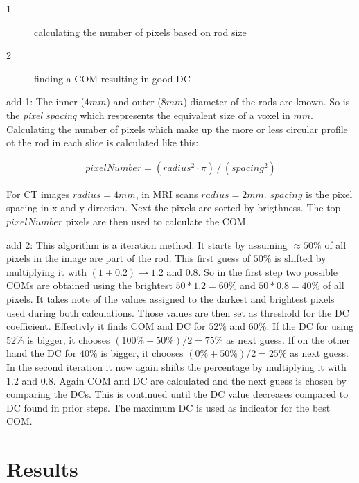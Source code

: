 \documentclass[parskip,bibtotoc,final,twoside=false,titlepage,a4paper,english,12pt,titlepage,a4paper]{scrbook}
\begin{document}
\begin{description}
 \item[1] calculating the number of pixels based on rod size
 \item[2] finding a COM resulting in good DC
\end{description}

add 1:
The inner ($4mm$) and outer ($8mm$) diameter of the rods are known. So is the \textit{pixel spacing} which respresents the equivalent size of a voxel in $mm$.
Calculating the number of pixels which make up the more or less circular profile ot the rod in each slice is calculated like this:

\begin{align}
 pixelNumber = (radius^2 \cdot \pi) \, / \, (spacing^2)
\end{align}

For CT images $radius = 4mm$, in MRI scans $radius = 2mm$. $spacing$ is the pixel spacing in x and y direction.
Next the pixels are sorted by brigthness. The top $pixelNumber$ pixels are then used to calculate the COM.

add 2:
This algorithm is a iteration method. It starts by assuming $\approx 50\%$ of all pixels in the image are part of the rod.
This first guess of $50\%$ is shifted by multiplying it with $(1 \pm 0.2) \rightarrow 1.2$ and $0.8$.
So in the first step two possible COMs are obtained using the brightest $50*1.2 = 60\%$ and $50*0.8 = 40\%$ of all pixels.
It takes note of the values assigned to the darkest and brightest pixels used during both calculations.
Those values are then set as threshold for the DC coefficient.
Effectivly it finds COM and DC for $52\%$ and $60\%$. If the DC for using 52\% is bigger, it chooses $(100\% + 50\%) / 2 = 75\%$ as next guess.
If on the other hand the DC for $40\%$ is bigger, it chooses $(0\% + 50\%) / 2 = 25\%$ as next guess.
In the second iteration it now again shifts the percentage by multiplying it with $1.2$ and $0.8$. Again COM and DC are calculated and the next guess is chosen by comparing the DCs.
This is continued until the DC value decreases compared to DC found in prior steps. The maximum DC is used as indicator for the best COM.


\chapter{Results}
\end{document}
